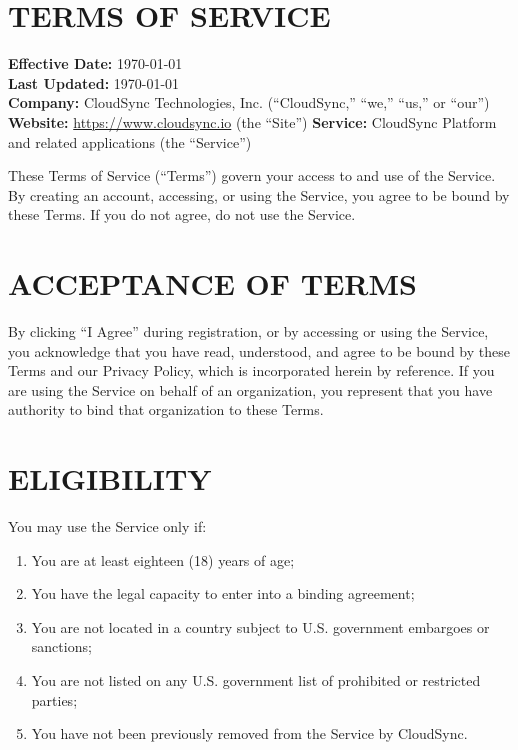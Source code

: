 \documentclass[
    language=english,
    doctype=terms-of-service,
    institution=none,
]{../../omnilatex}
\begin{document}
\maketitle

\section*{TERMS OF SERVICE}

\textbf{Effective Date:} \today\\
\textbf{Last Updated:} \today\\
\textbf{Company:} CloudSync Technologies, Inc. (``CloudSync,'' ``we,'' ``us,'' or ``our'')
\textbf{Website:} \url{https://www.cloudsync.io} (the ``Site'')
\textbf{Service:} CloudSync Platform and related applications (the ``Service'')

These Terms of Service (``Terms'') govern your access to and use of the Service. By creating an account, accessing, or using the Service, you agree to be bound by these Terms. If you do not agree, do not use the Service.

\section{ACCEPTANCE OF TERMS}

By clicking ``I Agree'' during registration, or by accessing or using the Service, you acknowledge that you have read, understood, and agree to be bound by these Terms and our Privacy Policy, which is incorporated herein by reference. If you are using the Service on behalf of an organization, you represent that you have authority to bind that organization to these Terms.

\section{ELIGIBILITY}

You may use the Service only if:
\begin{enumerate}
    \item You are at least eighteen (18) years of age;
    \item You have the legal capacity to enter into a binding agreement;
    \item You are not located in a country subject to U.S. government embargoes or sanctions;
    \item You are not listed on any U.S. government list of prohibited or restricted parties;
    \item You have not been previously removed from the Service by CloudSync.
\end{enumerate}
\end{document}
